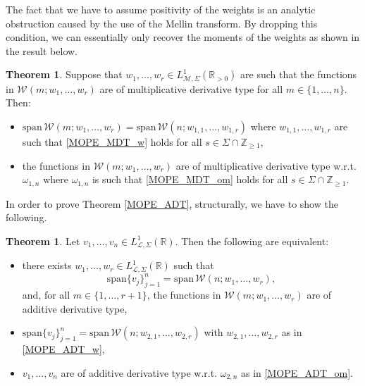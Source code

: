 \documentclass[a4paper,12pt,oneside]{article}
\theoremstyle{definition}
\newtheorem{thm}[defi]{Theorem}
\newcommand{\Z}{\mathbb{Z}}
\newcommand{\R}{\mathbb{R}}
\newcommand{\om}{\omega}
\newcommand{\spn}[1]{\text{span}\{#1\}}
\newcommand{\MT}[1]{\mathcal{M}#1}
\newcommand{\LT}[1]{\mathcal{L}#1}
\begin{document}
The fact that we have to assume positivity of the weights is an analytic obstruction caused by the use of the Mellin transform. By dropping this condition, we can essentially only recover the moments of the weights as shown in the result below.

\begin{thm} \label{MOPE_MDT_CORE_MOM}
    Suppose that $w_1,\dots,w_r\in L^1_{\MT{},\Sigma}(\R_{>0})$ are such that the functions in $\mathcal{W}(m;w_1,\dots,w_r)$ are of multiplicative derivative type for all $m\in\{1,\dots,n\}$. Then:
    \begin{itemize}
        \item[$i)$] $\text{span}\,\mathcal{W}(m;w_1,\dots,w_r)=\text{span}\,\mathcal{W}(n;w_{1,1},\dots,w_{1,r})$ where $w_{1,1},\dots,w_{1,r}$ are such that \eqref{MOPE_MDT_w} holds for all $s\in\Sigma\cap\Z_{\geq 1}$,
        \item[$ii)$] the functions in $\mathcal{W}(m;w_1,\dots,w_r)$ are of multiplicative derivative type w.r.t. $\om_{1,n}$ where $\om_{1,n}$ is such that \eqref{MOPE_MDT_om} holds for all $s\in\Sigma\cap\Z_{\geq 1}$.
    \end{itemize}
\end{thm}


In order to prove Theorem \ref{MOPE_ADT}, structurally, we have to show the following. 

\begin{thm} \label{MOPE_ADT_CORE}
    Let $v_1,\dots,v_n\in L^1_{\LT{},\Sigma}(\R)$. Then the following are equivalent:
    \begin{itemize}
        \item[$i)$] there exists $w_1,\dots,w_r\in L^1_{\LT{},\Sigma}(\R)$ such that 
        $$\spn{v_j}_{j=1}^n=\text{span}\,\mathcal{W}(n;w_1,\dots,w_r),$$
        and, for all $m\in\{1,\dots,r+1\}$, the functions in $\mathcal{W}(m;w_1,\dots,w_r)$ are of additive derivative type,
        \item[$ii)$] $\spn{v_j}_{j=1}^n=\text{span}\,\mathcal{W}(n;w_{2,1},\dots,w_{2,r})$ with $w_{2,1},\dots,w_{2,r}$ as in \eqref{MOPE_ADT_w},
        \item[$iii)$] $v_1,\dots,v_n$ are of additive derivative type w.r.t. $\om_{2,n}$ as in \eqref{MOPE_ADT_om}.
    \end{itemize}
\end{thm}
\end{document}

